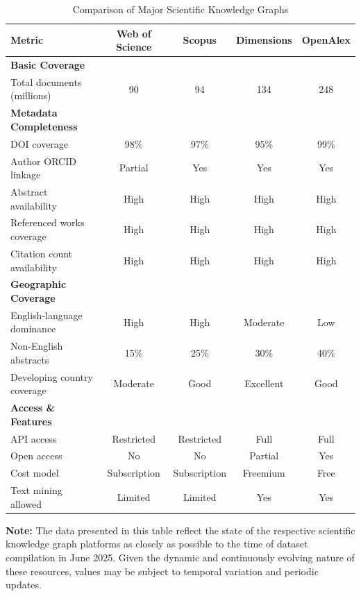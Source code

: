 \documentclass{article}
\begin{document}
\begin{table}[t]
	\centering
	\caption{Comparison of Major Scientific Knowledge Graphs}
	\label{tab:skg_comparison}
	\small
	\begin{tabular}{lcccc}
		\hline
		\textbf{Metric} & \textbf{Web of Science} & \textbf{Scopus} & \textbf{Dimensions} & \textbf{OpenAlex} \\
		\hline
		\textbf{Basic Coverage} & & & & \\
		Total documents (millions) & 90 & 94 & 134 & 248 \\
		\hline
		\textbf{Metadata Completeness} & & & & \\
		DOI coverage & 98\% & 97\% & 95\% & 99\% \\
		Author ORCID linkage & Partial & Yes & Yes & Yes \\
		Abstract availability & High & High & High & High \\
		Referenced works coverage & High & High & High & High \\
		Citation count availability & High & High & High & High \\
		\hline
		\textbf{Geographic Coverage} & & & & \\
		English-language dominance & High & High & Moderate & Low \\
		Non-English abstracts & 15\% & 25\% & 30\% & 40\% \\
		Developing country coverage & Moderate & Good & Excellent & Good \\
		\hline
		\textbf{Access \& Features} & & & & \\
		API access & Restricted & Restricted & Full & Full \\
		Open access & No & No & Partial & Yes \\
		Cost model & Subscription & Subscription & Freemium & Free \\
		Text mining allowed & Limited & Limited & Yes & Yes \\
		\hline
	\end{tabular}
	
	\vspace{2.5em}
	{\footnotesize
\textbf{Note:} The data presented in this table reflect the state of the respective scientific knowledge graph platforms as closely as possible to the time of dataset compilation in June 2025. Given the dynamic and continuously evolving nature of these resources, values may be subject to temporal variation and periodic updates.
	}
\end{table}
\end{document}
